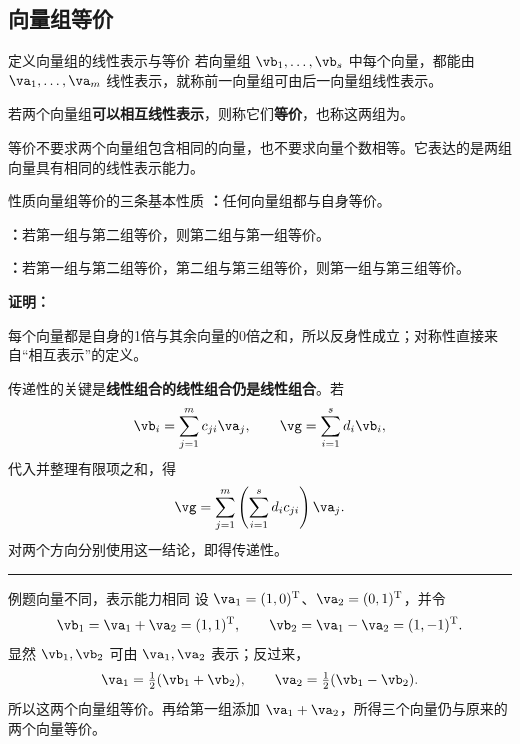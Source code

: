\documentclass[a4paper,12pt,twoside,openany,fontset=none]{ctexbook}
\let\oldsum\sum
\renewcommand{\sum}{\displaystyle\oldsum}
\newenvironment{property}[1][]{\begin{thmBox}{性质}{#1}}{\end{thmBox}}
\newcounter{definition}[chapter]
\newenvironment{definition}[1][]{\begin{defBox}{定义}{#1}}{\end{defBox}}
\newcounter{example}[chapter]
\newenvironment{example}[1][]{\begin{exBox}{例题}{#1}}{\end{exBox}}
\renewenvironment{proof}{
    \par\vspace{0.5em}\noindent
    \textbf{\color{LogicColor} 证明：}
}{
    \hfill \textcolor{LogicColor}{\rule{0.6em}{0.6em}} \par
}
\numberwithin{equation}{chapter}
\begin{document}
\subsection*{向量组等价}

\begin{definition}[向量组的线性表示与等价]
若向量组 $\vb_1,\ldots,\vb_s$ 中每个向量，都能由 $\va_1,\ldots,\va_m$ 线性表示，就称前一向量组可由后一向量组线性表示。

若两个向量组\textbf{可以相互线性表示}，则称它们\textbf{等价}，也称这两组为\textbf{}。
\end{definition}

等价不要求两个向量组包含相同的向量，也不要求向量个数相等。它表达的是两组向量具有相同的线性表示能力。

\begin{property}[向量组等价的三条基本性质]
\textbf{：}任何向量组都与自身等价。

\textbf{：}若第一组与第二组等价，则第二组与第一组等价。

\textbf{：}若第一组与第二组等价，第二组与第三组等价，则第一组与第三组等价。
\end{property}

\begin{proof}
每个向量都是自身的1倍与其余向量的0倍之和，所以反身性成立；对称性直接来自“相互表示”的定义。

传递性的关键是\textbf{线性组合的线性组合仍是线性组合}。若
\[
    \vb_i=\sum_{j=1}^{m}c_{ji}\va_j,\qquad
    \vg=\sum_{i=1}^{s}d_i\vb_i,
\]
代入并整理有限项之和，得
\[
    \vg=\sum_{j=1}^{m}\left(\sum_{i=1}^{s}d_i c_{ji}\right)\va_j.
\]
对两个方向分别使用这一结论，即得传递性。
\end{proof}

\begin{example}[向量不同，表示能力相同]
设 $\va_1=(1,0)^{\mathrm T}$、$\va_2=(0,1)^{\mathrm T}$，并令
\[
    \vb_1=\va_1+\va_2=(1,1)^{\mathrm T},\qquad
    \vb_2=\va_1-\va_2=(1,-1)^{\mathrm T}.
\]
显然 $\vb_1,\vb_2$ 可由 $\va_1,\va_2$ 表示；反过来，
\[
    \va_1=\tfrac12(\vb_1+\vb_2),\qquad
    \va_2=\tfrac12(\vb_1-\vb_2).
\]
所以这两个向量组等价。再给第一组添加 $\va_1+\va_2$，所得三个向量仍与原来的两个向量等价。
\end{example}
\end{document}
